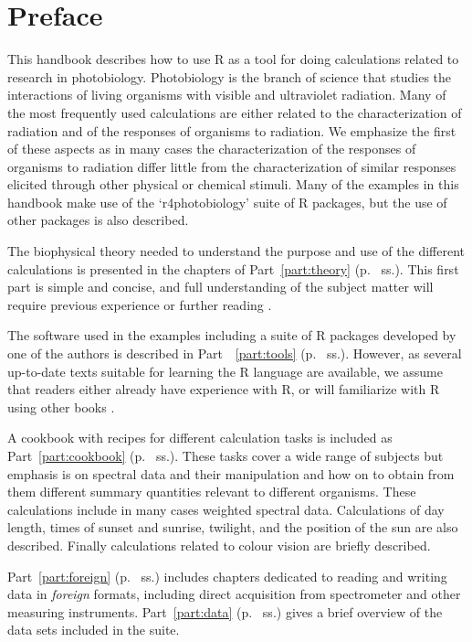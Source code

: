 \chapter{Preface}

This handbook describes how to use R as a tool for doing calculations related to research in photobiology. Photobiology is the branch of science that studies the interactions of living organisms with visible and ultraviolet radiation. Many of the most frequently used calculations are either related to the characterization of radiation and of the responses of organisms to radiation. We emphasize the first of these aspects as in many cases the characterization of the responses of organisms to radiation differ little from the characterization of similar responses elicited through other physical or chemical stimuli.
Many of the examples in this handbook make use of the `r4photobiology'  suite of R packages, but the use of other packages is also described.

The biophysical theory needed to understand the purpose and use of the different calculations is presented in the chapters of Part~\ref{part:theory} (p.~\pageref{part:theory} ss.). This first part is simple and concise, and full understanding of the subject matter will require previous experience or further reading \autocite[e.g.][]{Aphalo2012,Bjoern2015}.

The software used in the examples including a suite of R packages developed by one of the authors is described in Part~~\ref{part:tools} (p.~\pageref{part:tools} ss.). However, as several up-to-date texts suitable for learning the R language are available, we assume that readers either already have experience with R, or will familiarize with R using other books  \autocite[e.g.][]{Aphalo2016,Horton2015a,Paradis2005,Peng2016}.

A cookbook with recipes for different calculation tasks is included as Part~\ref{part:cookbook} (p.~\pageref{part:cookbook} ss.). These tasks cover a wide range of subjects but emphasis is on spectral data and their manipulation and how on to obtain from them different summary quantities relevant to different organisms. These calculations include in many cases weighted spectral data. Calculations of day length, times of sunset and sunrise, twilight, and the position of the sun are also described. Finally calculations related to colour vision are briefly described.

Part~\ref{part:foreign} (p.~\pageref{part:foreign} ss.) includes chapters dedicated to reading and writing data in \emph{foreign} formats, including direct acquisition from spectrometer and other measuring instruments. Part~\ref{part:data} (p.~\pageref{part:data} ss.) gives a brief overview of the data sets included in the suite.

